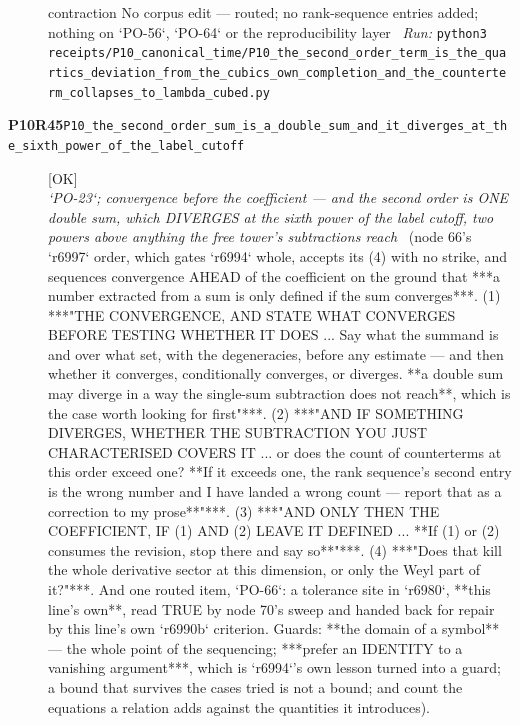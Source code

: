 \begin{description}
contraction  No corpus edit --- routed; no rank-sequence entries added; nothing on `PO-56`, `PO-64` or the reproducibility layer
\ \emph{Run:} \texttt{python3 receipts/P10\_canonical\_time/P10\_the\_second\_order\_term\_is\_the\_quartics\_deviation\_from\_the\_cubics\_own\_completion\_and\_the\_counterterm\_collapses\_to\_lambda\_cubed.py}
\item[\rcptlabel{P10_the_second_order_sum_is_a_double_sum_and_it_diverges_at_the_sixth_power_of_the_label_cutoff}{P10R45}\textbf{P10R45}\quad\texttt{P10\_the\_second\_order\_sum\_is\_a\_double\_sum\_and\_it\_diverges\_at\_the\_sixth\_power\_of\_the\_label\_cutoff}]\hfill\textsf{[OK]}\\
\textit{`PO-23`; convergence before the coefficient --- and the second order is ONE double sum, which DIVERGES at the sixth power of the label cutoff, two powers above anything the free tower's subtractions reach} \ (node 66's `r6997` order, which gates `r6994` whole, accepts its (4) with no strike, and sequences convergence AHEAD of the coefficient on the ground that ***a number extracted from a sum is only defined if the sum converges***. (1) ***"THE CONVERGENCE, AND STATE WHAT CONVERGES BEFORE TESTING WHETHER IT DOES ... Say what the summand is and over what set, with the degeneracies, before any estimate --- and then whether it converges, conditionally converges, or diverges. **a double sum may diverge in a way the single-sum subtraction does not reach**, which is the case worth looking for first"***. (2) ***"AND IF SOMETHING DIVERGES, WHETHER THE SUBTRACTION YOU JUST CHARACTERISED COVERS IT ... or does the count of counterterms at this order exceed one?  **If it exceeds one, the rank sequence's second entry is the wrong number and I have landed a wrong count --- report that as a correction to my prose**"***. (3) ***"AND ONLY THEN THE COEFFICIENT, IF (1) AND (2) LEAVE IT DEFINED ... **If (1) or (2) consumes the revision, stop there and say so**"***. (4) ***"Does that kill the whole derivative sector at this dimension, or only the Weyl part of it?"***.  And one routed item, `PO-66`: a tolerance site in `r6980`, **this line's own**, read TRUE by node 70's sweep and handed back for repair by this line's own `r6990b` criterion.  Guards: **the domain of a symbol** --- the whole point of the sequencing; ***prefer an IDENTITY to a vanishing argument***, which is `r6994`'s own lesson turned into a guard; a bound that survives the cases tried is not a bound; and count the equations a relation adds against the quantities it introduces). 

\end{description}
